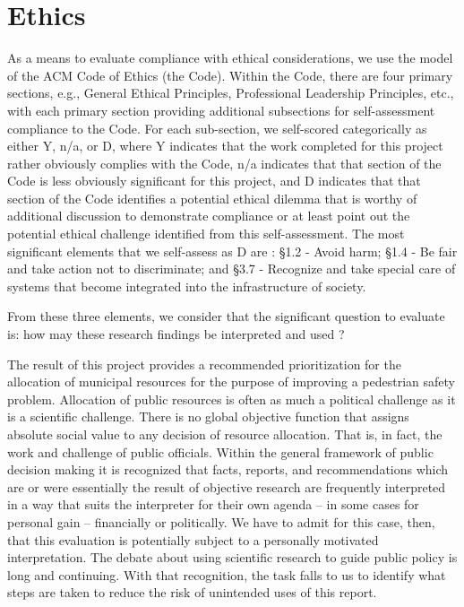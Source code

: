 \documentclass{llncs}
\begin{document}
%
\section{Ethics}
%
As a means to evaluate compliance with ethical considerations, we use the model of the ACM Code of Ethics  (the Code). Within the Code, there are four primary sections, e.g., General Ethical Principles, Professional Leadership Principles, etc., with each primary section providing additional subsections for self-assessment compliance to the Code. For each sub-section, we self-scored categorically as either Y, n/a, or D, where Y indicates that the work completed for this project rather obviously complies with the Code, n/a indicates that that section of the Code is less obviously significant for this project, and D indicates that that section of the Code identifies a potential ethical dilemma that is worthy of additional discussion to demonstrate compliance or at least point out the potential ethical challenge identified from this self-assessment.
The most significant elements that we self-assess as D are : \S 1.2 - Avoid harm; \S 1.4 - Be fair and take action not to discriminate; and \S 3.7 - Recognize and take special care of systems that become integrated into the infrastructure of society.

From these three elements, we consider that the significant question to evaluate is: how may these research findings be interpreted and used ?

The result of this project provides a recommended prioritization for the allocation of municipal resources for the purpose of improving a pedestrian safety problem. Allocation of  public resources is often as much a political challenge as it is a scientific challenge. There is no global objective function that assigns absolute social value to any decision of resource allocation. That is, in fact, the work and challenge of public officials. Within the general framework of public decision making it is recognized that facts, reports, and recommendations which are or were essentially the result of objective research are frequently interpreted in a way that suits the interpreter for their own agenda – in some cases for personal gain – financially or politically. We have to admit for this case, then, that this evaluation is potentially subject to a personally motivated interpretation. The debate about using scientific research to guide public policy is long and continuing. With that recognition, the task falls to us to identify what steps are taken to reduce the risk of unintended uses of this report.
\end{document}

